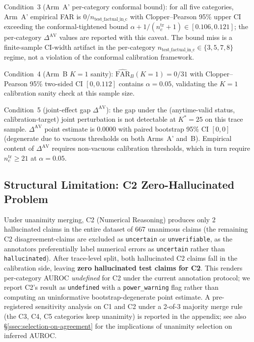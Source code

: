 \documentclass[runningheads]{llncs}
\begin{document}
Condition~3 (Arm~A' per-category conformal bound): for all five categories,
Arm~A' empirical FAR is $0/n_{\text{test\_factual\_in\_c}}$ with
Clopper--Pearson 95\% upper CI exceeding the conformal-tightened bound
$\alpha + 1/(n_c^{\text{tr}}+1) \in [0.106, 0.121]$; the per-category
$\Delta^{\text{AV}}$ values are reported with this caveat. The bound miss
is a finite-sample CI-width artifact in the per-category
$n_{\text{test\_factual\_in\_c}} \in \{3, 5, 7, 8\}$ regime, not a
violation of the conformal calibration framework.

Condition~4 (Arm~B $K=1$ sanity): $\hat{\text{FAR}}_B(K=1) = 0/31$ with
Clopper--Pearson 95\% two-sided CI $[0, 0.112]$ contains $\alpha = 0.05$,
validating the $K=1$ calibration sanity check at this sample size.

Condition~5 (joint-effect gap $\Delta^{\text{AV}}$): the gap under the
(anytime-valid status, calibration-target) joint perturbation is not
detectable at $K^* = 25$ on this trace sample. $\Delta^{\text{AV}}$ point
estimate is $0.0000$ with paired bootstrap 95\% CI $[0, 0]$ (degenerate
due to vacuous thresholds on both Arms~A' and~B). Empirical content of
$\Delta^{\text{AV}}$ requires non-vacuous calibration thresholds, which
in turn require $n_c^{\text{tr}} \geq 21$ at $\alpha = 0.05$.

\subsection{Structural Limitation: C2 Zero-Hallucinated Problem}
\label{ssec:c2-structural}

Under unanimity merging, C2 (Numerical Reasoning) produces only 2
hallucinated claims in the entire dataset of 667 unanimous claims (the
remaining C2 disagreement-claims are excluded as \texttt{uncertain} or
\texttt{unverifiable}, as the annotators preferentially label numerical
errors as \texttt{uncertain} rather than \texttt{hallucinated}). After
trace-level split, both hallucinated C2 claims fall in the calibration
side, leaving \textbf{zero hallucinated test claims for C2}. This renders
per-category AUROC \emph{undefined} for C2 under the current annotation
protocol; we report C2's result as \texttt{undefined} with a
\texttt{power\_warning} flag rather than computing an uninformative
bootstrap-degenerate point estimate. A pre-registered sensitivity analysis
on C1 and C2 under a 2-of-3 majority merge rule (the C3, C4, C5 categories
keep unanimity) is reported in the appendix; see also
\S\ref{ssec:selection-on-agreement} for the implications of unanimity
selection on inferred AUROC.
\end{document}
